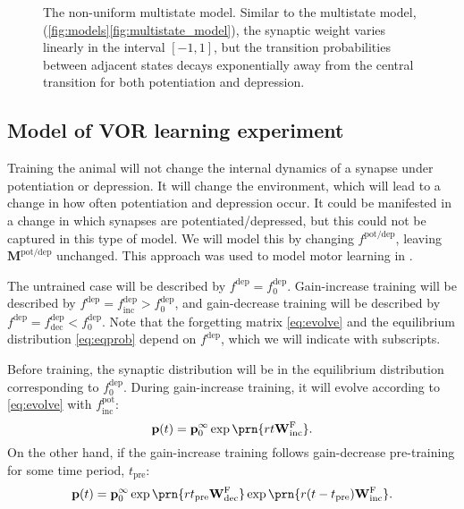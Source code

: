 \documentclass[10pt]{article}
\newcommand{\pr}{\mathbf{p}}
\newcommand{\eq}{\pr^\infty}
\newcommand{\W}{\mathbf{W}}
\newcommand{\frg}{\W^\mathrm{F}}
\newcommand{\M}{\mathbf{M}}
\newcommand{\pot}{^{\text{pot}}}
\newcommand{\dep}{^{\text{dep}}}
\newcommand{\potdep}{^{\text{pot/dep}}}
\newcommand{\norm}{_0}
\newcommand{\inc}{_{\text{inc}}}
\newcommand{\dec}{_{\text{dec}}}
\newcommand{\tpre}{t_{\text{pre}}}
\begin{document}
\begin{figure}
 \begin{center}
 \end{center}
  \caption[The non-uniform multistate model]{The non-uniform multistate model.
  Similar to the multistate model, (\autoref{fig:models}\ref{fig:multistate_model}), the synaptic weight varies linearly in the interval $[-1,1]$, but the transition probabilities between adjacent states decays exponentially away from the central transition for both potentiation and depression.} \label{fig:nonuni_model}
\end{figure}



\subsection{Model of VOR learning experiment}\label{sec:learning}

Training the animal will not change the internal dynamics of a synapse under potentiation or depression.
It will change the environment, which will lead to a change in how often potentiation and depression occur.
It could be manifested in a change in which synapses are potentiated/depressed, but this could not be captured in this type of model.
We will model this by changing $f\potdep$, leaving $\M\potdep$ unchanged.
This approach was used to model motor learning in \cite{Smith2006savings}.

The untrained case will be described by $f\dep=f\dep\norm$.
Gain-increase training  will be described by $f\dep=f\dep\inc>f\dep\norm$, and
gain-decrease training  will be described by $f\dep=f\dep\dec<f\dep\norm$.
Note that the forgetting matrix \eqref{eq:evolve} and the equilibrium distribution \eqref{eq:eqprob} depend on $f\dep$, which we will indicate with subscripts.

Before training, the synaptic distribution will be in the equilibrium distribution corresponding to $f\dep\norm$.
During gain-increase training, it will evolve according to \eqref{eq:evolve} with $f\pot\inc$:
%
\begin{equation}\label{eq:nopre}
  \pr(t) = \eq\norm \exp\prn{rt\frg\inc}.
\end{equation}
%
On the other hand, if the gain-increase training follows gain-decrease pre-training for some time period, $\tpre$:
%
\begin{equation}\label{eq:withpre}
  \pr(t) = \eq\norm \exp\prn{r\tpre\frg\dec} \exp\prn{r(t-\tpre)\frg\inc}.
\end{equation}
%
\end{document}
